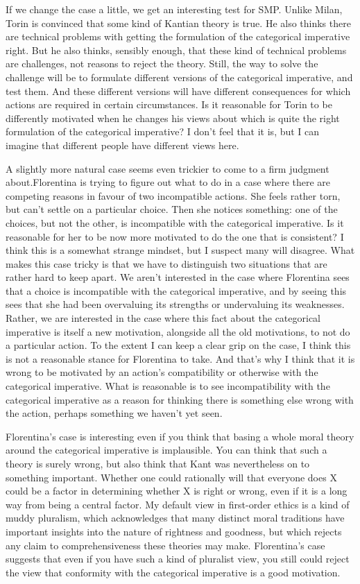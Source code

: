 \documentclass[
  10pt,
  letterpaper,
  twoside]{scrbook}
\begin{document}
If we change the case a little, we get an interesting test for SMP.
Unlike {Milan}, {Torin} is convinced that some kind of Kantian theory is
true. He also thinks there are technical problems with getting the
formulation of the categorical imperative right. But he also thinks,
sensibly enough, that these kind of technical problems are challenges,
not reasons to reject the theory. Still, the way to solve the challenge
will be to formulate different versions of the categorical imperative,
and test them. And these different versions will have different
consequences for which actions are required in certain circumstances. Is
it reasonable for {Torin} to be differently motivated when he changes
his views about which is quite the right formulation of the categorical
imperative? I don't feel that it is, but I can imagine that different
people have different views here.

A slightly more natural case seems even trickier to come to a firm
judgment about.{Florentina} is trying to figure out what to do in a case
where there are competing reasons in favour of two incompatible actions.
She feels rather torn, but can't settle on a particular choice. Then she
notices something: one of the choices, but not the other, is
incompatible with the categorical imperative. Is it reasonable for her
to be now more motivated to do the one that is consistent? I think this
is a somewhat strange mindset, but I suspect many will disagree. What
makes this case tricky is that we have to distinguish two situations
that are rather hard to keep apart. We aren't interested in the case
where {Florentina} sees that a choice is incompatible with the
categorical imperative, and by seeing this sees that she had been
overvaluing its strengths or undervaluing its weaknesses. Rather, we are
interested in the case where this fact about the categorical imperative
is itself a new motivation, alongside all the old motivations, to not do
a particular action. To the extent I can keep a clear grip on the case,
I think this is not a reasonable stance for {Florentina} to take. And
that's why I think that it is wrong to be motivated by an action's
compatibility or otherwise with the categorical imperative. What is
reasonable is to see incompatibility with the categorical imperative as
a reason for thinking there is something else wrong with the action,
perhaps something we haven't yet seen.

{Florentina}'s case is interesting even if you think that basing a whole
moral theory around the categorical imperative is implausible. You can
think that such a theory is surely wrong, but also think that Kant was
nevertheless on to something important. Whether one could rationally
will that everyone does X could be a factor in determining whether X is
right or wrong, even if it is a long way from being a central factor. My
default view in first-order ethics is a kind of muddy pluralism, which
acknowledges that many distinct moral traditions have important insights
into the nature of rightness and goodness, but which rejects any claim
to comprehensiveness these theories may make. {Florentina}'s case
suggests that even if you have such a kind of pluralist view, you still
could reject the view that conformity with the categorical imperative is
a good motivation.
\end{document}
